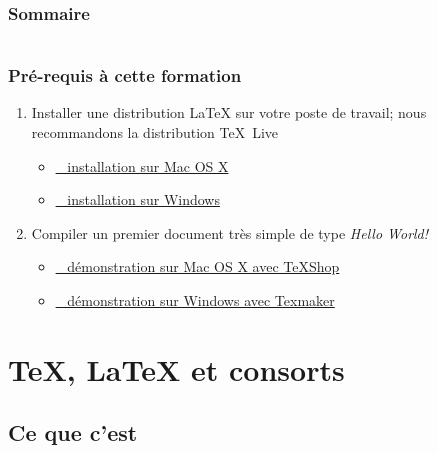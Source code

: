 \documentclass[aspectratio=54,10pt,xcolor=x11names]{beamer}
\newcommand{\capsule}[2]{\href{#1}{\faYoutubePlay~#2}}
\theoremstyle{example}
\begin{document}


\begin{frame}
  \frametitle{Sommaire}
  \small
  \begin{columns}[t]
    \begin{column}{.5\textwidth}
      \tableofcontents[sections={1-5},hideallsubsections]
    \end{column}
    \begin{column}{.5\textwidth}
      \tableofcontents[sections={6-9},hideallsubsections]
    \end{column}
  \end{columns}
\end{frame}

\begin{frame}
  \frametitle{Pré-requis à cette formation}
  \begin{enumerate}
  \item Installer une distribution {\LaTeX} sur votre poste de
    travail; nous recommandons la distribution {\TeX}~Live
    \begin{itemize}
    \item[] \capsule{https://www.youtube.com/watch?v=fjcR6lFy0c4}{%
        installation sur Mac OS X}
    \item[] \capsule{https://www.youtube.com/watch?v=z_dq3dns-WU}{%
        installation sur Windows}
    \end{itemize}
    \bigskip
  \item Compiler un premier document très simple de type \emph{Hello World!}
    \begin{itemize}
    \item[] \capsule{https://www.youtube.com/watch?v=QOUx_aOZ42o}{%
        démonstration sur Mac OS X avec TeXShop}
    \item[] \capsule{https://www.youtube.com/watch?v=qddRMGwXnNM}{%
        démonstration sur Windows avec Texmaker}
    \end{itemize}
  \end{enumerate}
\end{frame}


\section{{\TeX}, {\LaTeX} et consorts}

\subsection{Ce que c'est}
\end{document}
